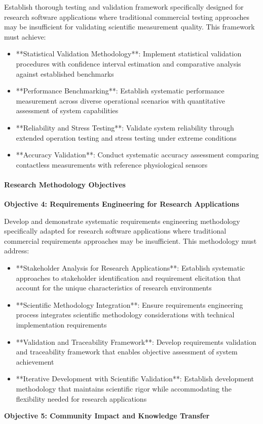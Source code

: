 \documentclass[11pt,a4paper]{article}
\begin{document}
Establish thorough testing and validation framework specifically designed for
research software applications where
traditional commercial testing approaches may be insufficient for validating
scientific measurement quality.  This
framework must achieve:

\begin{itemize}
\item **Statistical Validation Methodology**: Implement statistical validation procedures with confidence interval
  estimation and comparative analysis against established benchmarks
\item **Performance Benchmarking**: Establish systematic performance measurement across diverse operational scenarios with
  quantitative assessment of system capabilities
\item **Reliability and Stress Testing**: Validate system reliability through extended operation testing and stress testing
  under extreme conditions
\item **Accuracy Validation**: Conduct systematic accuracy assessment comparing contactless measurements with reference
  physiological sensors

\end{itemize}
\paragraph{Research Methodology Objectives}

\textbf{Objective 4: Requirements Engineering for Research Applications}

Develop and demonstrate systematic requirements engineering methodology specifically
adapted for research software
applications where traditional commercial requirements approaches may be insufficient.
This methodology must address:

\begin{itemize}
\item **Stakeholder Analysis for Research Applications**: Establish systematic approaches to stakeholder identification and
  requirement elicitation that account for the unique characteristics of research
  environments
\item **Scientific Methodology Integration**: Ensure requirements engineering process integrates scientific methodology
  considerations with technical implementation requirements
\item **Validation and Traceability Framework**: Develop requirements validation and traceability framework
  that enables objective assessment of system achievement
\item **Iterative Development with Scientific Validation**: Establish development methodology that maintains scientific
  rigor while accommodating the flexibility needed for research applications

\end{itemize}
\textbf{Objective 5: Community Impact and Knowledge Transfer}
\end{document}
